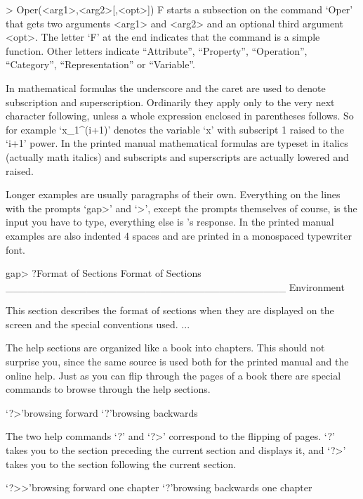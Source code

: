 \begintt
 > Oper(<arg1>,<arg2>[,<opt>]) F
\endtt
starts a subsection on the command `Oper' that gets two arguments <arg1>
and <arg2> and an optional third argument <opt>. The letter `F' at the end
indicates that the command is a simple function. Other letters indicate
``Attribute'', ``Property'', ``Operation'', ``Category'', ``Representation''
or ``Variable''.


In mathematical formulas the underscore and the caret are used to denote
subscription and superscription. Ordinarily they apply only to the very
next character following, unless a whole expression enclosed in
parentheses follows. So for example `x_1^(i+1)' denotes the variable `x'
with subscript 1 raised to the `i+1' power. In the printed manual
mathematical formulas are typeset in italics (actually math italics) and
subscripts and superscripts are actually lowered and raised.

Longer examples are usually paragraphs of their own.
Everything on the lines with the prompts `gap>' and `>', except
the prompts themselves of course, is the input you have to type,
everything else is {\GAP}'s response. In the printed manual examples
are also indented 4 spaces and are printed in a monospaced typewriter
font.

\begintt
gap> ?Format of Sections
Format of Sections ______________________________________ Environment

This section describes the format of sections when they are displayed
on the screen and the special conventions used.
... 
\endtt


The help sections are organized like a book into chapters. This should
not surprise you, since the same source is used both for the printed
manual and the online help. Just as you can flip through the pages of a
book there are special commands to browse through the help sections.

\>`?>'{browsing forward}
\>`?\<'{browsing backwards}

The two help commands `?\<' and `?>' correspond to the flipping of pages.
`?\<' takes you to the section preceding the current section and displays
it, and `?>' takes you to the section following the current section.

\>`?>>'{browsing forward one chapter}
\>`?\<\<'{browsing backwards one chapter}

